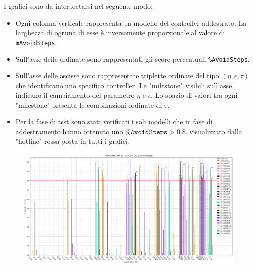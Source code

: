 I grafici sono da interpretarsi nel seguente modo:
\begin{itemize}
    \item Ogni colonna verticale rappresenta un modello del controller addestrato. La larghezza di ognuna di esse è inversamente proporzionale al valore di \texttt{mAvoidSteps}.
    \item Sull'asse delle ordinate sono rappresentati gli score percentuali \texttt{\%AvoidSteps}.
    \item Sull'asse delle ascisse sono rappresentate triplette ordinate del tipo $(\eta, \epsilon, \tau)$ che identificano uno specifico controller. Le "milestone" visibili sull'asse indicano il cambiamento del parametro $\eta$ e $\epsilon$. Lo spazio di valori tra ogni "milestone" presenta le combinazioni ordinate di $\tau$.
    \item Per la fase di test sono stati verificati i soli modelli che in fase di addestramento hanno ottenuto uno $\texttt{\%AvoidSteps} > 0.8$, visualizzato dalla "hotline" rossa posta in tutti i grafici. 
\end{itemize}


\newpage
\thispagestyle{empty}

\begin{figure}[H]
    \centering
    \includegraphics[scale=0.55,rotate=-90]{figures/train_annv2_2d.png}
    \caption{}
    \label{fig:TrainV2}
\end{figure}

\newpage
\thispagestyle{empty}

